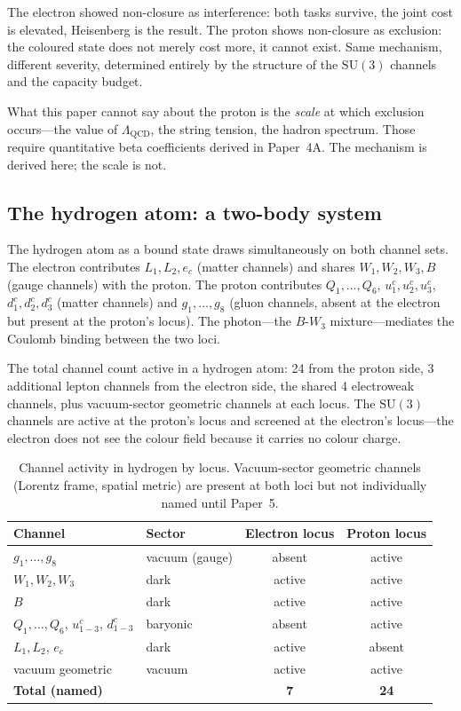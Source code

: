 \documentclass[11pt]{article}
\newcommand{\SU}{\mathrm{SU}}
\begin{document}
The electron showed non-closure as interference: both tasks survive, the
joint cost is elevated, Heisenberg is the result.  The proton shows
non-closure as exclusion: the coloured state does not merely cost more, it
cannot exist.  Same mechanism, different severity, determined entirely by
the structure of the $\SU(3)$ channels and the capacity budget.

What this paper cannot say about the proton is the \emph{scale} at which
exclusion occurs---the value of $\Lambda_{\mathrm{QCD}}$, the string
tension, the hadron spectrum.  Those require quantitative beta
coefficients derived in Paper~4A.  The mechanism is derived here; the
scale is not.

\subsection*{The hydrogen atom: a two-body system}

The hydrogen atom as a bound state draws simultaneously on both channel
sets.  The electron contributes $L_1, L_2, e_c$ (matter channels) and
shares $W_1, W_2, W_3, B$ (gauge channels) with the proton.  The proton
contributes $Q_1,\ldots,Q_6$, $u^c_1, u^c_2, u^c_3$, $d^c_1, d^c_2,
d^c_3$ (matter channels) and $g_1,\ldots,g_8$ (gluon channels, absent
at the electron but present at the proton's locus).  The photon---the
$B$-$W_3$ mixture---mediates the Coulomb binding between the two loci.

The total channel count active in a hydrogen atom: 24 from the proton
side, 3 additional lepton channels from the electron side, the shared 4
electroweak channels, plus vacuum-sector geometric channels at each
locus.  The $\SU(3)$ channels are active at the proton's locus and
screened at the electron's locus---the electron does not see the colour
field because it carries no colour charge.

\begin{table}[h]
\centering\small
\begin{tabular}{llcc}
\toprule
\textbf{Channel} & \textbf{Sector} & \textbf{Electron locus} & \textbf{Proton locus} \\
\midrule
$g_1,\ldots,g_8$ & vacuum (gauge) & absent & active \\
$W_1, W_2, W_3$ & dark & active & active \\
$B$              & dark & active & active \\
$Q_1,\ldots,Q_6$, $u^c_{1-3}$, $d^c_{1-3}$ & baryonic & absent & active \\
$L_1, L_2$, $e_c$ & dark & active & absent \\
vacuum geometric & vacuum & active & active \\
\midrule
\textbf{Total (named)} & & \textbf{7} & \textbf{24} \\
\bottomrule
\end{tabular}
\caption{Channel activity in hydrogen by locus.  Vacuum-sector geometric
channels (Lorentz frame, spatial metric) are present at both loci but not
individually named until Paper~5.}
\end{table}
\end{document}
